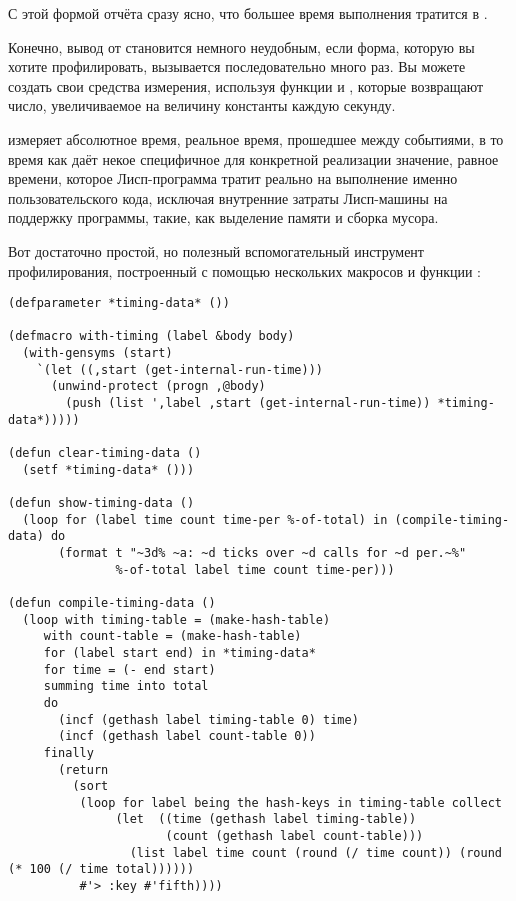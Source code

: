 С этой формой отчёта сразу ясно, что большее время выполнения  тратится в
.

Конечно, вывод от  становится немного неудобным, если форма, которую вы хотите
профилировать, вызывается последовательно много раз. Вы можете создать свои средства
измерения, используя функции  и ,
которые возвращают число, увеличиваемое на величину константы
 каждую секунду.

 измеряет абсолютное время, реальное время, прошедшее между
событиями, в то время как  даёт некое специфичное для
конкретной реализации значение, равное времени, которое Лисп-программа тратит реально на
выполнение именно пользовательского кода, исключая внутренние затраты Лисп-машины на
поддержку программы, такие, как выделение памяти и сборка мусора.

Вот достаточно простой, но полезный вспомогательный инструмент профилирования, построенный
с помощью нескольких макросов и функции :

\begin{lstlisting}
(defparameter *timing-data* ())

(defmacro with-timing (label &body body)
  (with-gensyms (start)
    `(let ((,start (get-internal-run-time)))
      (unwind-protect (progn ,@body)
        (push (list ',label ,start (get-internal-run-time)) *timing-data*)))))

(defun clear-timing-data ()
  (setf *timing-data* ()))

(defun show-timing-data ()
  (loop for (label time count time-per %-of-total) in (compile-timing-data) do
       (format t "~3d% ~a: ~d ticks over ~d calls for ~d per.~%" 
               %-of-total label time count time-per)))

(defun compile-timing-data () 
  (loop with timing-table = (make-hash-table)
     with count-table = (make-hash-table)
     for (label start end) in *timing-data*
     for time = (- end start)
     summing time into total
     do
       (incf (gethash label timing-table 0) time)
       (incf (gethash label count-table 0))
     finally 
       (return
         (sort
          (loop for label being the hash-keys in timing-table collect
               (let  ((time (gethash label timing-table))
                      (count (gethash label count-table)))
                 (list label time count (round (/ time count)) (round (* 100 (/ time total))))))
          #'> :key #'fifth))))
\end{lstlisting}

